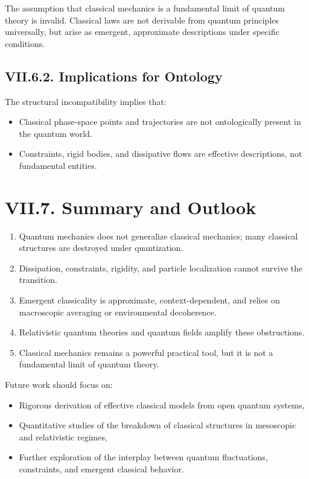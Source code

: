 \documentclass[12pt,oneside]{book}
\theoremstyle{plain}
\theoremstyle{definition}
\begin{document}
The assumption that classical mechanics is a fundamental limit of quantum theory is invalid. Classical laws are not derivable from quantum principles universally, but arise as emergent, approximate descriptions under specific conditions.

\subsection*{VII.6.2. Implications for Ontology}

The structural incompatibility implies that:

\begin{itemize}
    \item Classical phase-space points and trajectories are not ontologically present in the quantum world.
    \item Constraints, rigid bodies, and dissipative flows are effective descriptions, not fundamental entities.
\end{itemize}

\section{VII.7. Summary and Outlook}

\begin{enumerate}
    \item Quantum mechanics does not generalize classical mechanics; many classical structures are destroyed under quantization.
    \item Dissipation, constraints, rigidity, and particle localization cannot survive the transition.
    \item Emergent classicality is approximate, context-dependent, and relies on macroscopic averaging or environmental decoherence.
    \item Relativistic quantum theories and quantum fields amplify these obstructions.
    \item Classical mechanics remains a powerful practical tool, but it is not a fundamental limit of quantum theory.
\end{enumerate}

Future work should focus on:

\begin{itemize}
    \item Rigorous derivation of effective classical models from open quantum systems,
    \item Quantitative studies of the breakdown of classical structures in mesoscopic and relativistic regimes,
    \item Further exploration of the interplay between quantum fluctuations, constraints, and emergent classical behavior.
\end{itemize}
\end{document}
